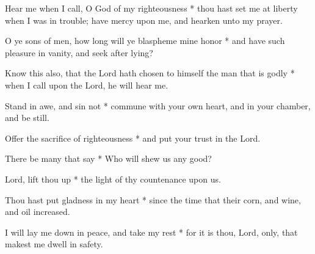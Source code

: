 \begin{multicols}{2}
	
	Hear me when I call, O God of my righteousness * thou hast set me at liberty when I was in trouble; have mercy upon me, and hearken unto my prayer.
	
	O ye sons of men, how long will ye blaspheme mine honor * and have such pleasure in vanity, and seek after lying?
	
	Know this also, that the Lord hath chosen to himself the man that is godly * when I call upon the Lord, he will hear me.
	
	Stand in awe, and sin not * commune with your own heart, and in your chamber, and be still.
	
	Offer the sacrifice of righteousness * and put your trust in the Lord.
	
	There be many that say * Who will shew us any good?
	
	Lord, lift thou up * the light of thy countenance upon us.
	
	Thou hast put gladness in my heart * since the time that their corn, and wine, and oil increased.
	
	I will lay me down in peace, and take my rest * for it is thou, Lord, only, that makest me dwell in safety.
	
	\gloria{}
\end{multicols}